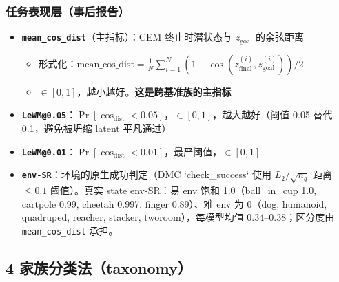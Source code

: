 \documentclass[11pt,a4paper]{article}
\begin{document}
\subsubsection{任务表现层（事后报告）}

\begin{itemize}[leftmargin=2em]
    \item \textbf{\texttt{mean\_cos\_dist}}（主指标）：CEM 终止时潜状态与 $z_\text{goal}$ 的余弦距离
    \begin{itemize}
        \item 形式化：$\text{mean\_cos\_dist} = \frac{1}{N}\sum_{i=1}^{N}\!\left(1 - \cos(z_\text{final}^{(i)}, z_\text{goal}^{(i)})\right) / 2$
        \item $\in [0, 1]$，越小越好。\textbf{这是跨基准族的主指标}
    \end{itemize}
    \item \textbf{\texttt{LeWM@0.05}}：$\Pr[\cos_\text{dist} < 0.05]$，$\in [0, 1]$，越大越好（阈值 0.05 替代 0.1，避免被坍缩 latent 平凡通过）
    \item \textbf{\texttt{LeWM@0.01}}：$\Pr[\cos_\text{dist} < 0.01]$，最严阈值，$\in [0, 1]$
    \item \textbf{\texttt{env-SR}}：环境的原生成功判定（DMC `check\_success` 使用 $L_2 / \sqrt{n_q}$ 距离 $\leq 0.1$ 阈值）。真实 state env-SR：易 env 饱和 1.0（ball\_in\_cup 1.0, cartpole 0.99, cheetah 0.997, finger 0.89）、难 env 为 0（dog, humanoid, quadruped, reacher, stacker, tworoom），每模型均值 0.34–0.38；区分度由 \texttt{mean\_cos\_dist} 承担。

\end{itemize}

\subsection{4 家族分类法（taxonomy）}
\end{document}
